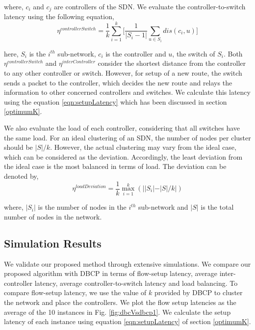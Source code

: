 \documentclass{IEEEtran}
\begin{document}
	where, $c_i$ and $c_j$ are controllers of the SDN. We evaluate the controller-to-switch latency using the following equation,
	\begin{equation} \label{eqn:controllerSwitch}
	\eta^{controllerSwitch} = \frac{1}{k}\sum_{i=1}^{k}\bigg[\frac{1}{|S_i-1|}\sum_{u\in S_i}dis(c_i,u)\bigg]
	\end{equation}
	
	here, $S_i$ is the $i^{th}$ sub-network, $c_i$ is the controller and $u$, the switch of $S_i$. Both $\eta^{controllerSwitch}$ and $\eta^{interController}$ consider the shortest distance from the controller to any other controller or switch. However, for setup of a new route, the switch sends a packet to the controller, which decides the new route and relays the information to other concerned controllers and switches. We calculate this latency using the equation \ref{eqn:setupLatency} which has been discussed in section \ref{optimumK}.
	
	We also evaluate the load of each controller, considering that all switches have the same load. For an ideal clustering of an SDN, the number of nodes per cluster should be $|S|/k$. However, the actual clustering may vary from the ideal case, which can be considered as the deviation. Accordingly, the least deviation from the ideal case is the most balanced in terms of load. The deviation can be denoted by,
	\begin{equation} \label{eqn:deviation}
	\eta^{loadDeviation}=\frac{1}{k}\max_{i=1}^{k}(||S_i|-|S|/k|)
	\end{equation}
	
	where, $|S_i|$ is the number of nodes in the $i^{th}$ sub-network and $|S|$ is the total number of nodes in the network.
	
	\subsection{Simulation Results} \label{results}
	We validate our proposed method through extensive simulations. We compare our proposed algorithm with DBCP \cite{dbcp2017} in terms of flow-setup latency, average inter-controller latency, average controller-to-switch latency and load balancing. To compare flow-setup latency, we use the value of $k$ provided by DBCP to cluster the network and place the controllers. We plot the flow setup latencies as the average of the 10 instances in Fig. \ref{fig:dbcVsdbcp1}. We calculate the setup latency of each instance using equation \ref{eqn:setupLatency} of section \ref{optimumK}.
	
\end{document}
